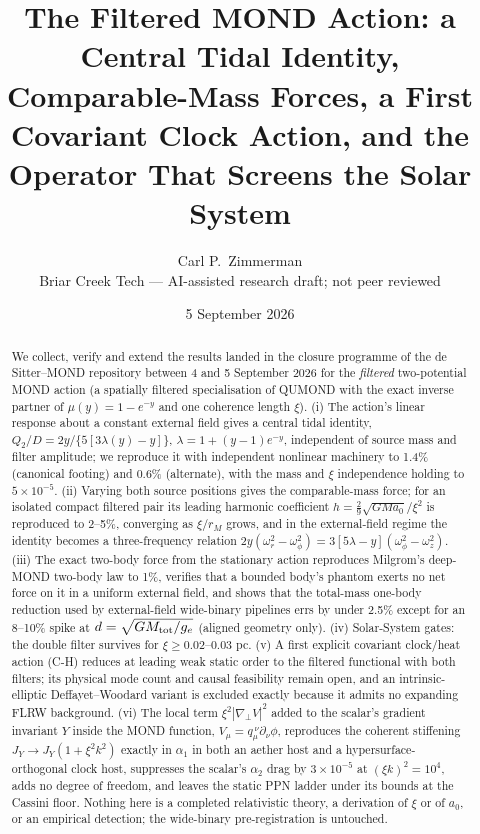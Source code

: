 \documentclass[11pt,letterpaper]{article}
\title{The Filtered MOND Action: a Central Tidal Identity, Comparable-Mass Forces, a First Covariant Clock Action, and the Operator That Screens the Solar System}
\author{Carl P.\ Zimmerman\\ \small Briar Creek Tech --- AI-assisted research draft; not peer reviewed}
\date{5 September 2026}
\begin{document}
\maketitle
\begin{abstract}
We collect, verify and extend the results landed in the closure programme of the de Sitter--MOND repository between 4 and 5 September 2026 for the \emph{filtered} two-potential MOND action (a spatially filtered specialisation of QUMOND with the exact inverse partner of $\mu(y)=1-e^{-y}$ and one coherence length $\xi$). (i) The action's linear response about a constant external field gives a central tidal identity, $Q_2/D=2y/\{5[3\lambda(y)-y]\}$, $\lambda=1+(y-1)e^{-y}$, independent of source mass and filter amplitude; we reproduce it with independent nonlinear machinery to 1.4\% (canonical footing) and 0.6\% (alternate), with the mass and $\xi$ independence holding to $5\times10^{-5}$. (ii) Varying both source positions gives the comparable-mass force; for an isolated compact filtered pair its leading harmonic coefficient $h=\tfrac{2}{9}\sqrt{GMa_0}/\xi^2$ is reproduced to 2--5\%, converging as $\xi/r_M$ grows, and in the external-field regime the identity becomes a three-frequency relation $2y(\omega_r^2-\omega_\phi^2)=3[5\lambda-y](\omega_\phi^2-\omega_z^2)$. (iii) The exact two-body force from the stationary action reproduces Milgrom's deep-MOND two-body law to 1\%, verifies that a bounded body's phantom exerts no net force on it in a uniform external field, and shows that the total-mass one-body reduction used by external-field wide-binary pipelines errs by under 2.5\% except for an 8--10\% spike at $d=\sqrt{GM_{\rm tot}/g_e}$ (aligned geometry only). (iv) Solar-System gates: the double filter survives for $\xi\ge0.02$--$0.03$ pc. (v) A first explicit covariant clock/heat action (C-H) reduces at leading weak static order to the filtered functional with both filters; its physical mode count and causal feasibility remain open, and an intrinsic-elliptic Deffayet--Woodard variant is excluded exactly because it admits no expanding FLRW background. (vi) The local term $\xi^2|\nabla_\perp V|^2$ added to the scalar's gradient invariant $Y$ inside the MOND function, $V_\mu=q_\mu^{\ \nu}\partial_\nu\phi$, reproduces the coherent stiffening $J_Y\to J_Y(1+\xi^2k^2)$ exactly in $\alpha_1$ in both an aether host and a hypersurface-orthogonal clock host, suppresses the scalar's $\alpha_2$ drag by $3\times10^{-5}$ at $(\xi k)^2=10^4$, adds no degree of freedom, and leaves the static PPN ladder under its bounds at the Cassini floor. Nothing here is a completed relativistic theory, a derivation of $\xi$ or of $a_0$, or an empirical detection; the wide-binary pre-registration is untouched.
\end{abstract}
\end{document}
